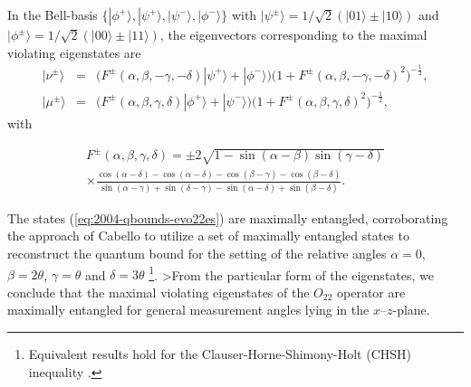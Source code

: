 \documentclass[prl,showpacs,showkeys,amsfonts,amsmath,twocolumn]{revtex4}
\begin{document}
In the Bell-basis
$\{|\phi^+ \rangle,|\psi^+ \rangle,|\psi^- \rangle,|\phi^- \rangle\}$ with
$|\psi^\pm \rangle = 1/\sqrt{2}(|01 \rangle \pm |10 \rangle)$ and
$|\phi^\pm \rangle = 1/\sqrt{2}(|00 \rangle \pm |11 \rangle)$,
the eigenvectors corresponding to the maximal violating
eigenstates are
\begin{equation}
\begin{array}{ccl}
  |\nu^\pm \rangle&=&\big(F^\pm(\alpha,\beta,-\gamma ,-\delta  ) |\psi^+ \rangle +
  |\phi^- \rangle\big)\big(1+F^\pm(\alpha,\beta ,-\gamma,-\delta )^2\big)^{-\frac{1}{2}},\\
  |\mu^\pm \rangle&=&\big(F^\pm(\alpha,\beta,\gamma,\delta )|\phi^+ \rangle +
  |\psi^- \rangle\big)\big(1+F^\pm(\alpha ,\beta,\gamma,\delta )^2\big)^{-\frac{1}{2}},
\end{array}
\label{eq:2004-qbounds-evo22es}
\end{equation}
with
\begin{small}
\begin{multline*}F^\pm(\alpha ,\beta ,\gamma,\delta )=\pm 2\sqrt{1-\sin(\alpha -\beta )\sin(\gamma -\delta )}\\
\times \frac{\cos(\alpha -\delta )-\cos(\alpha -\delta )-\cos(\beta -\gamma )-\cos(\beta -\delta )}
{\sin(\alpha -\gamma )+\sin(\delta -\gamma )-\sin(\alpha -\delta )
  +\sin(\beta -\delta )}.
\end{multline*}
\end{small}
The states (\ref{eq:2004-qbounds-evo22es})
are maximally entangled, corroborating the approach of
Cabello \cite{cabello-2003a} to utilize a set of
maximally entangled states to
reconstruct the quantum bound for the setting of the relative angles
$\alpha=0$, $\beta=2\theta$, $\gamma=\theta$ and $\delta=3\theta$ \footnote{
Equivalent results hold for the Clauser-Horne-Shimony-Holt (CHSH) inequality
 \cite{mermin-1995,cereceda-2001}.}.
>From the
particular form of the eigenstates, we conclude that the maximal
violating eigenstates of the $O_{22}$  operator are maximally
entangled for general measurement angles lying in the $x$--$z$-plane.
\end{document}
